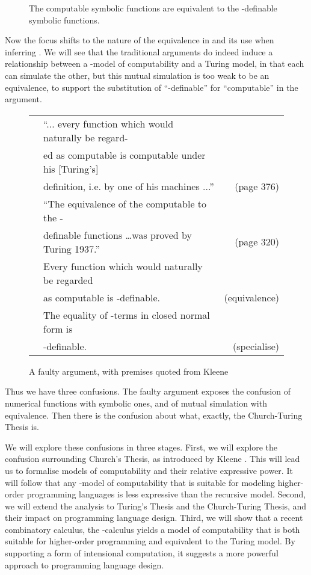 \documentclass[a4paper]{article}
\begin{document}
\begin{description}
\item[]   The computable symbolic functions are equivalent to
the -definable symbolic functions.
\end{description}

\noindent 
Now the focus shifts to the nature of the equivalence in  and
its use when inferring .  We will see that the traditional
arguments do indeed induce a relationship between a -model of
computability and a Turing model, in that each can simulate the other,
but this mutual simulation is too weak to be an equivalence, to support
the substitution of ``-definable'' for ``computable'' in the argument. 



\begin{figure}
\begin{tabular}{rlr}
 &
 ``... every function which would naturally be
  regard- \\ & ed as computable is computable under his [Turing's] \\ &  definition, i.e. by
  one of his machines ...'' & (page 376) \\
 &  ``The equivalence of the computable to the -\\ &  definable functions \ldots was proved by Turing 1937.'' & (page 320) \\
 &
  Every function which would naturally be regarded  \\ & as computable is -definable. &(equivalence) \\
 &
The equality of  -terms in closed normal form is \\ & -definable. &(specialise) 
\end{tabular}
\caption{A faulty argument, with premises quoted from Kleene \cite{Kleene52}}
\label{fig:faulty}
\end{figure}

Thus we have three confusions. The faulty argument exposes the
confusion of numerical functions with symbolic ones, and of mutual
simulation with equivalence. Then there is the confusion about what,
exactly, the Church-Turing Thesis is.

We will explore these confusions in three stages.  First, we will
explore the confusion surrounding Church's Thesis, as introduced by
Kleene \cite{Kleene52}. This will lead us to formalise models of
computability and their relative expressive power. It will follow that
any -model of computability that is suitable for modeling
higher-order programming languages is less expressive than the
recursive model.  Second, we will extend the analysis to Turing's
Thesis and the Church-Turing Thesis, and their impact on programming
language design.  Third, we will show that a recent combinatory
calculus, the -calculus \cite{JGW11} yields a model of
computability that is both suitable for higher-order programming and
equivalent to the Turing model.  By supporting a form of intensional
computation, it suggests a more powerful approach to programming
language design.
\end{document}
